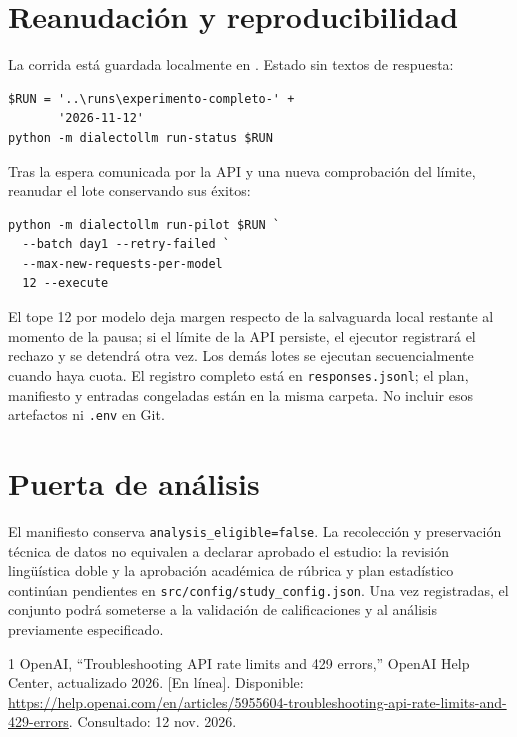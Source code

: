 \documentclass[conference]{IEEEtran}
\begin{document}
\section{Reanudación y reproducibilidad}
La corrida está guardada localmente en . Estado sin textos de respuesta:
\begin{verbatim}
$RUN = '..\runs\experimento-completo-' +
       '2026-11-12'
python -m dialectollm run-status $RUN
\end{verbatim}
Tras la espera comunicada por la API y una nueva comprobación del límite, reanudar el lote conservando sus éxitos:
\begin{verbatim}
python -m dialectollm run-pilot $RUN `
  --batch day1 --retry-failed `
  --max-new-requests-per-model
  12 --execute
\end{verbatim}
El tope 12 por modelo deja margen respecto de la salvaguarda local restante al momento de la pausa; si el límite de la API persiste, el ejecutor registrará el rechazo y se detendrá otra vez. Los demás lotes se ejecutan secuencialmente cuando haya cuota. El registro completo está en \texttt{responses.jsonl}; el plan, manifiesto y entradas congeladas están en la misma carpeta. No incluir esos artefactos ni \texttt{.env} en Git.

\section{Puerta de análisis}
El manifiesto conserva \texttt{analysis\_eligible=false}. La recolección y preservación técnica de datos no equivalen a declarar aprobado el estudio: la revisión lingüística doble y la aprobación académica de rúbrica y plan estadístico continúan pendientes en \texttt{src/config/study\_config.json}. Una vez registradas, el conjunto podrá someterse a la validación de calificaciones y al análisis previamente especificado.

\begin{thebibliography}{1}
 OpenAI, ``Troubleshooting API rate limits and 429 errors,'' OpenAI Help Center, actualizado 2026. [En línea]. Disponible: \url{https://help.openai.com/en/articles/5955604-troubleshooting-api-rate-limits-and-429-errors}. Consultado: 12 nov. 2026.
\end{thebibliography}
\end{document}
